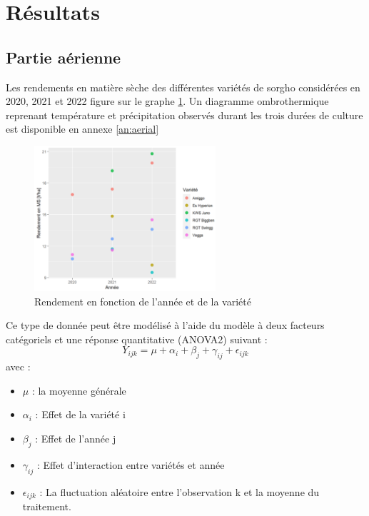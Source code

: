 \section{Résultats}

\subsection{Partie aérienne}

Les rendements en matière sèche des différentes variétés de sorgho considérées en 2020, 2021 et 2022 figure sur le graphe \ref{fig:rendement}.
Un diagramme ombrothermique reprenant température et précipitation observés durant les trois durées de culture est disponible en annexe \ref{an:aerial}


\begin{figure}[ht]
\centering
\includegraphics[width=0.6\textwidth]{Image/rendement.png}
\caption{Rendement en fonction de l'année et de la variété}
\label{fig:rendement}
\end{figure}

Ce type de donnée peut être modélisé à l'aide du modèle à deux facteurs catégoriels et une réponse quantitative (ANOVA2) suivant :
\begin{equation}
    Y_{ijk} = \mu + \alpha_{i} + \beta_{j} + \gamma_{ij} + \epsilon_{ijk}
\end{equation}
avec :
\begin{itemize}
    \item $\mu$ : la moyenne générale
    \item $\alpha_i$ : Effet de la variété i 
    \item $\beta_j$ : Effet de l'année j
    \item $\gamma_{ij}$ : Effet d'interaction entre variétés et année
    \item $\epsilon_{ijk}$ : La fluctuation aléatoire entre l'observation k et la moyenne du traitement. 
\end{itemize}

